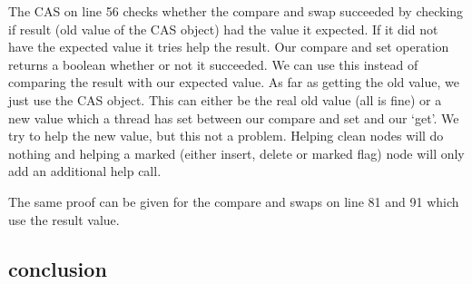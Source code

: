 \documentclass[10pt,a4paper]{article}
\begin{document}
The CAS on line 56 checks whether the compare and swap succeeded by checking if result (old value of the CAS object) had the value it expected. If it did not have the expected value it tries help the result. Our compare and set operation returns a boolean whether or not it succeeded. We can use this instead of comparing the result with our expected value. As far as getting the old value, we just use the CAS object. This can either be the real old value (all is fine) or a new value which a thread has set between our compare and set and our `get'. We try to help the new value, but this not a problem. Helping clean nodes will do nothing and helping a marked (either insert, delete or marked flag) node will only add an additional help call.

The same proof can be given for the compare and swaps on line 81 and 91 which use the result value.




\subsection{conclusion}
\end{document}
